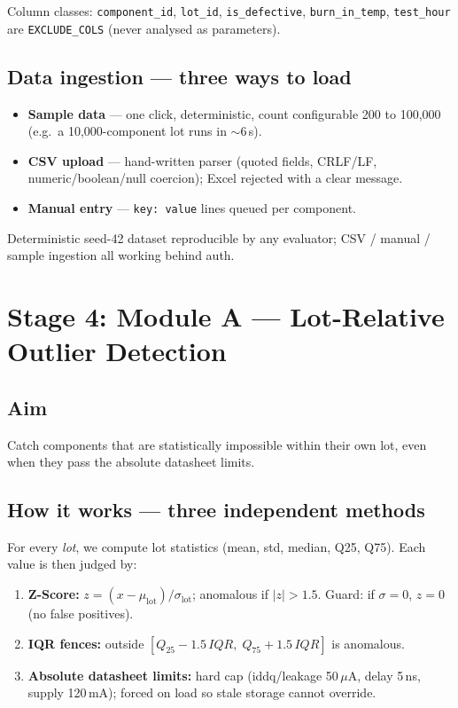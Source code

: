 \documentclass[11pt,a4paper]{article}
\newcommand{\code}[1]{\texttt{\small #1}}
\newcommand{\milestone}[1]{\par\vspace{0.6em}\noindent
  \begin{tcolorbox}[colback=solgreen!8,colframe=solgreen,
    title={\sffamily\bfseries\color{white}Milestone},arc=2pt,boxrule=1pt]
    #1
  \end{tcolorbox}\par\vspace{0.4em}}
\begin{document}
\noindent Column classes: \code{component\_id}, \code{lot\_id}, \code{is\_defective},
\code{burn\_in\_temp}, \code{test\_hour} are \code{EXCLUDE\_COLS} (never analysed as
parameters).

\subsection*{Data ingestion --- three ways to load}
\begin{itemize}[leftmargin=1.5em]
  \item \textbf{Sample data} --- one click, deterministic, count configurable 200 to 100{,}000
        (e.g.\ a 10{,}000-component lot runs in $\sim$6\,s).
  \item \textbf{CSV upload} --- hand-written parser (quoted fields, CRLF/LF, numeric/boolean/null
        coercion); Excel rejected with a clear message.
  \item \textbf{Manual entry} --- \code{key: value} lines queued per component.
\end{itemize}

\milestone{Deterministic seed-42 dataset reproducible by any evaluator; CSV / manual / sample
  ingestion all working behind auth.}

\section{Stage 4: Module A --- Lot-Relative Outlier Detection}

\subsection*{Aim}
Catch components that are statistically impossible within their own lot, even when they pass the
absolute datasheet limits.

\subsection*{How it works --- three independent methods}
For every \emph{lot}, we compute lot statistics (mean, std, median, Q25, Q75). Each value is then
judged by:

\begin{enumerate}[leftmargin=1.5em]
  \item \textbf{Z-Score:} $z=(x-\mu_{\text{lot}})/\sigma_{\text{lot}}$; anomalous if
        $|z|>1.5$. Guard: if $\sigma=0$, $z=0$ (no false positives).
  \item \textbf{IQR fences:} outside $[Q_{25}-1.5\,IQR,\; Q_{75}+1.5\,IQR]$ is anomalous.
  \item \textbf{Absolute datasheet limits:} hard cap (iddq/leakage 50\,$\mu$A, delay 5\,ns,
        supply 120\,mA); forced on load so stale storage cannot override.
\end{enumerate}
\end{document}
